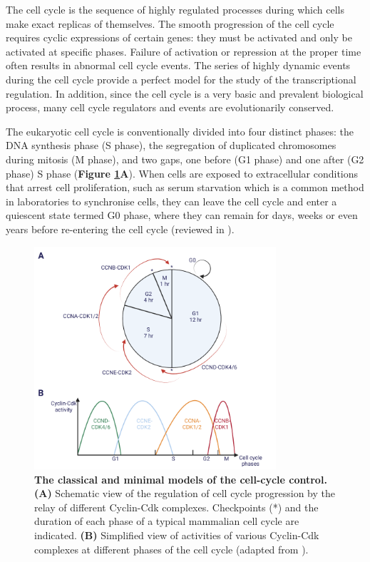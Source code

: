 The cell cycle is the sequence of highly regulated processes during which cells make exact replicas of themselves. The smooth progression of the cell cycle requires cyclic expressions of certain genes: they must be activated and only be activated at specific phases. Failure of activation or repression at the proper time often results in abnormal cell cycle events. The series of highly dynamic events during the cell cycle provide a perfect model for the study of the transcriptional regulation. In addition, since the cell cycle is a very basic and prevalent biological process, many cell cycle regulators and events are evolutionarily conserved.

The eukaryotic cell cycle is conventionally divided into four distinct phases: the DNA synthesis phase (S phase), the segregation of duplicated chromosomes during mitosis (M phase), and two gaps, one before (G1 phase) and one after (G2 phase) S phase (\textbf{Figure \ref{fig:fig3}A}). When cells are exposed to extracellular conditions that arrest cell proliferation, such as serum starvation which is a common method in laboratories to synchronise cells, they can leave the cell cycle and enter a quiescent state termed G0 phase, where they can remain for days, weeks or even years before re-entering the cell cycle (reviewed in \cite{62}).

\begin{figure}[!ht]
    \centering
    \includegraphics[width=0.8\textwidth]{chapter1/figures/fig3.pdf}
    \caption[The classical and minimal models of the cell-cycle control]{\textbf{The classical and minimal models of the cell-cycle control. (A)} Schematic view of the regulation of cell cycle progression by the relay of different Cyclin-Cdk complexes. Checkpoints (*) and the duration of each phase of a typical mammalian cell cycle are indicated. \textbf{(B)} Simplified view of activities of various Cyclin-Cdk complexes at different phases of the cell cycle (adapted from \cite{hochegger2008cyclin-dependent}).}
    \label{fig:fig3}
\end{figure}

